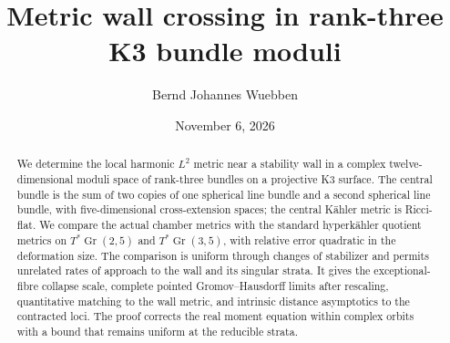 \documentclass[11pt]{amsart}
\title[Metric wall crossing in K3 bundle moduli]{Metric wall crossing in rank-three K3 bundle moduli}
\author{Bernd Johannes Wuebben}
\date{November 6, 2026}
\theoremstyle{definition}
\theoremstyle{remark}
\DeclareMathOperator{\Gr}{Gr}
\begin{document}
\begin{abstract}
We determine the local harmonic $L^2$ metric near a stability wall in a
complex twelve-dimensional moduli space of rank-three bundles on a
projective K3 surface. The central bundle is the sum of two copies of one
spherical line bundle and a second spherical line bundle, with
five-dimensional cross-extension spaces; the central K\"ahler metric is
Ricci-flat. We compare the actual chamber metrics with the standard
hyperk\"ahler quotient metrics on $T^*\Gr(2,5)$ and $T^*\Gr(3,5)$, with
relative error quadratic in the deformation size. The comparison is
uniform through changes of stabilizer and permits unrelated rates of
approach to the wall and its singular strata. It gives the exceptional-fibre
collapse scale, complete pointed Gromov--Hausdorff limits after rescaling,
quantitative matching to the wall metric, and intrinsic distance
asymptotics to the contracted loci. The proof corrects the real moment
equation within complex orbits with a bound that remains uniform at the
reducible strata.
\end{abstract}
\maketitle








\end{document}
